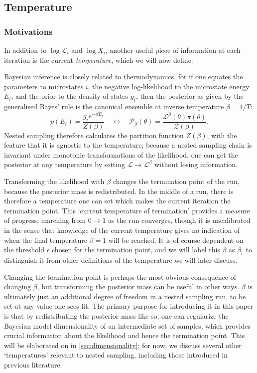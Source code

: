 \documentclass[usenatbib]{mnras}
\newcommand{\Like}{\mathcal{L}}
\begin{document}
\subsection{Temperature}\label{sec:temperature}
\subsubsection*{Motivations}
In addition to $\log \Like_i$ and $\log X_i$, another useful piece of information at each iteration is the current \textit{temperature}, which we will now define.
\par
Bayesian inference is closely related to thermodynamics, for if one equates the parameters to microstates $i$, the negative log-likelihood to the microstate energy $E_i$, and the prior to the density of states $g_i$, then the posterior as given by the generalised Bayes' rule is the canonical ensemble at inverse temperature $\beta = 1/T$:
\begin{equation}
    p(E_i) = \frac{g_i e^{-\beta E_i}}{Z(\beta)} \quad \leftrightarrow \quad \mathcal{P}_\beta(\theta) = \frac{\Like^{\beta}(\theta)\pi(\theta)}{\mathcal{Z}(\beta)}.
\end{equation}
Nested sampling therefore calculates the partition function $Z(\beta)$, with the feature that it is agnostic to the temperature; because a nested sampling chain is invariant under monotonic transformations of the likelihood, one can get the posterior at any temperature by setting $\Like \to \Like^\beta$ without losing information.
\par
Transforming the likelihood with $\beta$ changes the termination point of the run, because the posterior mass is redistributed. In the middle of a run, there is therefore a temperature one can set which makes the current iteration the termination point. This `current temperature of termination' provides a measure of progress, marching from $0 \to 1$ as the run converges, though it is uncalibrated in the sense that knowledge of the current temperature gives no indication of when the final temperature $\beta = 1$ will be reached. It is of course dependent on the threshold $\epsilon$ chosen for the termination point, and we will label this $\beta$ as $\beta_\epsilon$ to distinguish it from other definitions of the temperature we will later discuss.
\par
Changing the termination point is perhaps the most obvious consequence of changing $\beta$, but transforming the posterior mass can be useful in other ways. $\beta$ is ultimately just an additional degree of freedom in a nested sampling run, to be set at any value one sees fit. The primary purpose for introducing it in this paper is that by redistributing the posterior mass like so, one can regularize the Bayesian model dimensionality of an intermediate set of samples, which provides crucial information about the likelihood and hence the termination point. This will be elaborated on in \cref{sec:dimensionality}; for now, we discuss several other `temperatures' relevant to nested sampling, including those introduced in previous literature.
\end{document}
